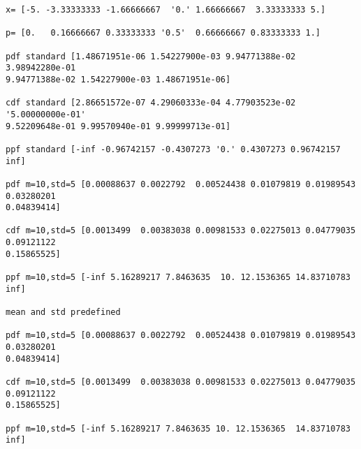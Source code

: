\begin{verbatim}
x= [-5. -3.33333333 -1.66666667  '0.' 1.66666667  3.33333333 5.] 

p= [0.   0.16666667 0.33333333 '0.5'  0.66666667 0.83333333 1.] 

pdf standard [1.48671951e-06 1.54227900e-03 9.94771388e-02 3.98942280e-01
9.94771388e-02 1.54227900e-03 1.48671951e-06] 

cdf standard [2.86651572e-07 4.29060333e-04 4.77903523e-02 '5.00000000e-01'
9.52209648e-01 9.99570940e-01 9.99999713e-01] 

ppf standard [-inf -0.96742157 -0.4307273 '0.' 0.4307273 0.96742157 inf] 

pdf m=10,std=5 [0.00088637 0.0022792  0.00524438 0.01079819 0.01989543 0.03280201
0.04839414] 

cdf m=10,std=5 [0.0013499  0.00383038 0.00981533 0.02275013 0.04779035 0.09121122
0.15865525] 

ppf m=10,std=5 [-inf 5.16289217 7.8463635  10. 12.1536365 14.83710783 inf] 

mean and std predefined 

pdf m=10,std=5 [0.00088637 0.0022792  0.00524438 0.01079819 0.01989543 0.03280201
0.04839414] 

cdf m=10,std=5 [0.0013499  0.00383038 0.00981533 0.02275013 0.04779035 0.09121122
0.15865525] 

ppf m=10,std=5 [-inf 5.16289217 7.8463635 10. 12.1536365  14.83710783 inf] 

\end{verbatim}

